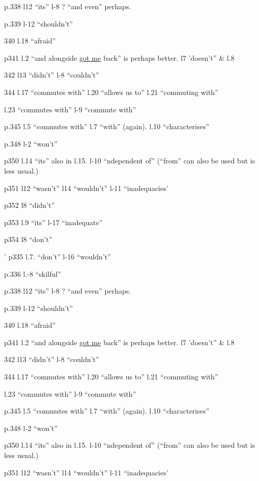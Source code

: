 p.338 l12 ``its'' l-8 ? ``and even'' perhaps.

p.339 l-12 ``shouldn't'' 

340 l.18 ``afraid''

p341 l.2 ``and alongside \uline{got me} back'' is perhaps better. l7 'doesn't'' \& l.8

342 l13 ``didn't'' l-8 ``couldn't''

344 l.17 ``commutes with'' l.20 ``allows us to'' l.21 ``commuting with''

l.23 ``commutes with'' l-9 ``commute with''

p.345 l.5 ``commutes with'' l.7 ``with'' (again). l.10 ``characterises''

p.348 l-2 ``won't''

p350 l.14 ``its'' also in l.15. l-10 ``ndependent of'' (``from'' can also be used but is less usual.)

p351 l12 ``wasn't'' l14 ``wouldn't'' l-11 ``inadequacies'

p352 l8 ``didn't''

p353 l.9 ``its'' l-17 ``inadequate''

p354 l8 ``don't''



' p335 l.7. ``don't'' l-16 ``wouldn't''

p.336 l.-8 ``skilful''

p.338 l12 ``its'' l-8 ? ``and even'' perhaps.

p.339 l-12 ``shouldn't'' 

340 l.18 ``afraid''

p341 l.2 ``and alongside \uline{got me} back'' is perhaps better. l7 'doesn't'' \& l.8

342 l13 ``didn't'' l-8 ``couldn't''

344 l.17 ``commutes with'' l.20 ``allows us to'' l.21 ``commuting with''

l.23 ``commutes with'' l-9 ``commute with''

p.345 l.5 ``commutes with'' l.7 ``with'' (again). l.10 ``characterises''

p.348 l-2 ``won't''

p350 l.14 ``its'' also in l.15. l-10 ``ndependent of'' (``from'' can also be used but is less usual.)

p351 l12 ``wasn't'' l14 ``wouldn't'' l-11 ``inadequacies'

